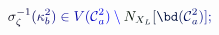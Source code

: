 \documentclass[12pt]{article}
\begin{document}
\makeatletter
\renewcommand*{\@textcolor}[3]{%
  \protect\leavevmode
  \begingroup
    \color#1{#2}#3%
  \endgroup
}
\makeatother
\begin{displaymath}
\mathcolor[RGB]{0,0,15}{\sigma} _ { \mathcolor[RGB]{0,0,30}{\zeta} } ^ { \mathcolor[RGB]{0,0,45}{-} \mathcolor[RGB]{0,0,60}{1} } \mathcolor[RGB]{0,0,75}{(} \mathcolor[RGB]{0,0,90}{\kappa} _ { \mathcolor[RGB]{0,0,105}{b} } ^ { \mathcolor[RGB]{0,0,120}{2} } \mathcolor[RGB]{0,0,135}{)} \mathcolor[RGB]{0,0,150}{\in} \mathcolor[RGB]{0,0,165}{V} \mathcolor[RGB]{0,0,180}{(} \mathcal { \mathcolor[RGB]{0,0,195}{C} } _ { \mathcolor[RGB]{0,0,210}{a} } ^ { \mathcolor[RGB]{0,0,225}{2} } \mathcolor[RGB]{0,0,240}{)} \mathcolor[RGB]{0,0,255}{\setminus} \mathcolor[RGB]{0,15,0}{N} _ { \mathcolor[RGB]{0,15,15}{X} _ { \mathcolor[RGB]{0,15,30}{L} } } \mathcolor[RGB]{0,15,45}{[} \mathcolor[RGB]{0,15,60}{\bd} \mathcolor[RGB]{0,15,75}{(} \mathcal { \mathcolor[RGB]{0,15,90}{C} } _ { \mathcolor[RGB]{0,15,105}{a} } ^ { \mathcolor[RGB]{0,15,120}{2} } \mathcolor[RGB]{0,15,135}{)} \mathcolor[RGB]{0,15,150}{]} \mathcolor[RGB]{0,15,165}{;}
\end{displaymath}
\end{document}
